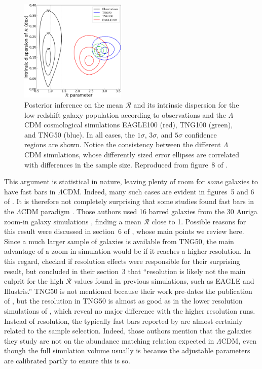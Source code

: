 \documentclass[fleqn,usenatbib,useAMS]{mnras} %
\begin{document}
\begin{figure}
	\centering
	\includegraphics[width=0.45\textwidth]{Roshan_2021_bar_speed_Figure_8}
	\caption{Posterior inference on the mean $\mathcal{R}$ and its intrinsic dispersion for the low redshift galaxy population according to observations \citep[black;][]{Cuomo_2020} and the $\Lambda$CDM cosmological simulations EAGLE100 (red), TNG100 (green), and TNG50 (blue). In all cases, the $1\sigma$, $3\sigma$, and $5\sigma$ confidence regions are shown. Notice the consistency between the different $\Lambda$CDM simulations, whose differently sized error ellipses are correlated with differences in the sample size. Reproduced from figure~8 of \citet{Roshan_2021_bar_speed}.}
	\label{Roshan_2021_bar_speed_inference}
\end{figure}

This argument is statistical in nature, leaving plenty of room for \emph{some} galaxies to have fast bars in $\Lambda$CDM. Indeed, many such cases are evident in figures~5 and 6 of \citet{Roshan_2021_bar_speed}. It is therefore not completely surprising that some studies found fast bars in the $\Lambda$CDM paradigm \citep[e.g.][]{Fragkoudi_2021}. Those authors used 16 barred galaxies from the 30 Auriga zoom-in galaxy simulations \citep{Grand_2017}, finding a mean $\mathcal{R}$ close to 1. Possible reasons for this result were discussed in section~6 of \citet{Roshan_2021_bar_speed}, whose main points we review here. Since a much larger sample of galaxies is available from TNG50, the main advantage of a zoom-in simulation would be if it reaches a higher resolution. In this regard, \citet{Fragkoudi_2021} checked if resolution effects were responsible for their surprising result, but concluded in their section~3 that ``resolution is likely not the main culprit for the high $\mathcal{R}$ values found in previous simulations, such as EAGLE and Illustris.'' TNG50 is not mentioned because their work pre-dates the publication of \citet{Roshan_2021_bar_speed}, but the resolution in TNG50 is almost as good as in the lower resolution simulations of \citet{Fragkoudi_2021}, which reveal no major difference with the higher resolution runs. Instead of resolution, the typically fast bars reported by \citet{Fragkoudi_2021} are almost certainly related to the sample selection. Indeed, those authors mention that the galaxies they study are not on the abundance matching relation expected in $\Lambda$CDM, even though the full simulation volume usually is because the adjustable parameters are calibrated partly to ensure this is so.
\end{document}

